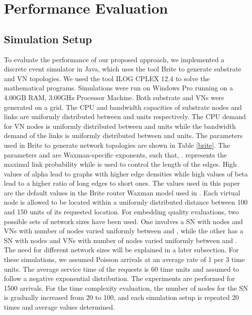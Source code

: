 \documentclass[journal]{IEEEtran}
\begin{document}
\section{Performance Evaluation}
\subsection{Simulation Setup}
To evaluate the performance of our proposed approach, we implemented a discrete event simulator in Java, which uses the tool Brite \cite{Medina01} to generate substrate and \ac{VN} topologies. We used the tool ILOG CPLEX 12.4 \cite{CPLEX12.4} to solve the mathematical programs. Simulations were run on Windows  Pro running on a 4.00GB RAM, 3.00GHz Processor Machine. Both substrate and \acp{VN} were generated on a  grid. The CPU and bandwidth capacities of substrate nodes and links are uniformly distributed between  and  units respectively. The CPU demand for \ac{VN} nodes is uniformly distributed between  and  units while the bandwidth demand of the links is uniformly distributed between  and  units. The parameters used in Brite to generate network topologies are shown in Table \ref{brite}. The parameters  and  are Waxman-specific exponents, such that, .  represents the maximal link probability while  is used to control the length of the edges. High values of alpha lead to graphs with higher edge densities while high values of beta lead to a higher ratio of long edges to short ones. The values used in this paper are the default values in the Brite router Waxman model used in \cite{Medina01}. Each virtual node is allowed to be located within a uniformly distributed distance between 100 and 150 units of its requested location. For embedding quality evaluations, two possible sets of network sizes have been used. One involves a \ac{SN} with  nodes and \acp{VN} with number of nodes varied uniformly between  and , while the other has a \ac{SN} with  nodes and \acp{VN} with number of nodes varied uniformly between  and . The need for different network sizes will be explained in a later subsection. For these simulations, we assumed Poisson arrivals at an average rate of 1 per 3 time units. The average service time of the requests is 60 time units and assumed to follow a negative exponential distribution. The experiments are performed for 1500 arrivals. For the time complexity evaluation, the number of nodes for the \ac{SN} is gradually increased from 20 to 100, and each simulation setup is repeated 20 times and average values determined. 
\end{document}
